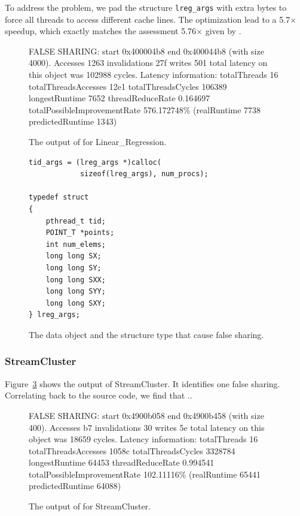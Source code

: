 To address the problem, we pad the structure {\tt lreg\_args} with extra bytes to force all threads to access different cache lines. The optimization lead to a 5.7$\times$ speedup, which exactly matches the assessment 5.76$\times$ given by \cheetah{}.

\begin{figure}
\begin{minipage}{\columnwidth}

\centering

\fbox
{
\begin{minipage}{3in}
FALSE SHARING: start 0x400004b8 end 0x400044b8 (with size 4000). Accesses 1263 invalidations 27f writes 501 total latency on this object was 102988 cycles.
Latency information: totalThreads 16 totalThreadsAccesses 12e1 totalThreadsCycles 106389 longestRuntime 7652 threadReduceRate 0.164697 totalPossibleImprovementRate 576.172748\% (realRuntime 7738 predictedRuntime 1343)
\end{minipage}
}
\vspace{1em}
\caption{The output of \cheetah{} for Linear\_Regression.}
\label{fig:lr}
\end{minipage}
\end{figure}


\begin{figure}
\begin{verbatim}
tid_args = (lreg_args *)calloc(
	        sizeof(lreg_args), num_procs);

typedef struct
{
    pthread_t tid;
    POINT_T *points;
    int num_elems;
    long long SX;
    long long SY;
    long long SXX;
    long long SYY;
    long long SXY;
} lreg_args;	    
\end{verbatim}
\caption{The data object and the structure type that cause false sharing.}
\label{lr:code}
\end{figure}

\subsubsection{StreamCluster}

Figure~\ref{fig:sc} shows the output of StreamCluster. It identifies one false sharing. Correlating back to the source code, we find that ..

\begin{figure}
\begin{minipage}{\columnwidth}

\centering

\fbox
{
\begin{minipage}{3in}
FALSE SHARING: start 0x4900b058 end 0x4900b458 (with size 400). Accesses b7 invalidations 30 writes 5e total latency on this object was 18659 cycles.
Latency information: totalThreads 16 totalThreadsAccesses 1058c totalThreadsCycles 3328784 longestRuntime 64453 threadReduceRate 0.994541 totalPossibleImprovementRate 102.11116\% (realRuntime 65441 predictedRuntime 64088)
\end{minipage}
}
\vspace{1em}
\caption{The output of \cheetah{} for StreamCluster.}
\label{fig:sc}
\end{minipage}
\end{figure}

